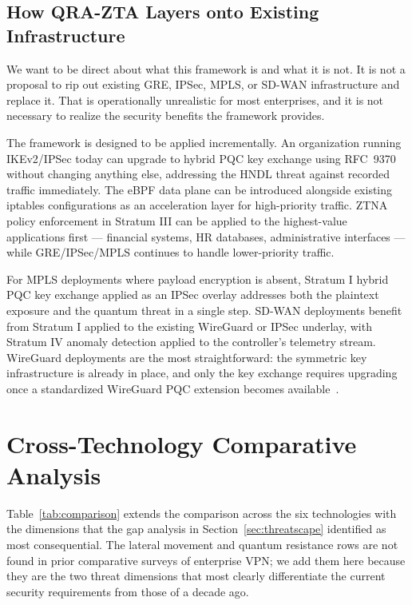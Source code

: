 \documentclass[conference]{IEEEtran}
\begin{document}
\subsection{How QRA-ZTA Layers onto Existing Infrastructure}

We want to be direct about what this framework is and what it
is not. It is not a proposal to rip out existing GRE, IPSec,
MPLS, or SD-WAN infrastructure and replace it. That is
operationally unrealistic for most enterprises, and it is
not necessary to realize the security benefits the framework
provides.

The framework is designed to be applied incrementally. An
organization running IKEv2/IPSec today can upgrade to hybrid
PQC key exchange using RFC~9370~\cite{rfc9370} without changing
anything else, addressing the HNDL threat against recorded
traffic immediately. The eBPF data plane can be introduced
alongside existing iptables configurations as an acceleration
layer for high-priority traffic. ZTNA policy enforcement in
Stratum III can be applied to the highest-value applications
first --- financial systems, HR databases, administrative
interfaces --- while GRE/IPSec/MPLS continues to handle
lower-priority traffic.

For MPLS deployments where payload encryption is absent,
Stratum I hybrid PQC key exchange applied as an IPSec overlay
addresses both the plaintext exposure and the quantum threat
in a single step. SD-WAN deployments benefit from Stratum I
applied to the existing WireGuard or IPSec underlay, with
Stratum IV anomaly detection applied to the controller's
telemetry stream. WireGuard deployments are the most
straightforward: the symmetric key infrastructure is already
in place, and only the key exchange requires upgrading once
a standardized WireGuard PQC extension becomes
available~\cite{hu2020pq}.

\section{Cross-Technology Comparative Analysis}
\label{sec:discussion}

Table~\ref{tab:comparison} extends the comparison across the
six technologies with the dimensions that the gap analysis in
Section~\ref{sec:threatscape} identified as most consequential.
The lateral movement and quantum resistance rows are not found
in prior comparative surveys of enterprise VPN; we add them
here because they are the two threat dimensions that most
clearly differentiate the current security requirements from
those of a decade ago.
\end{document}
